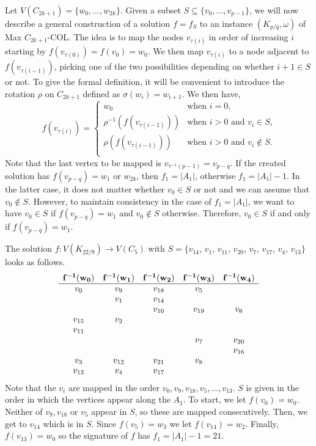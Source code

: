 \documentclass[11pt,a4paper]{article}
\begin{document}
Let $V(C_{2k+1}) = \{w_0, \ldots, w_{2k}\}$.
Given a subset $S \subseteq \{v_0, \ldots, v_{p-1}\}$, we will now describe a general construction
of a solution $f = f_S$ to an instance $(K_{p/q}, \omega)$ of {\sc Max $C_{2k+1}$-COL}.
The idea is to map the nodes $v_{\tau(i)}$ in order of increasing $i$ starting by $f(v_{\tau(0)}) = f(v_0) = w_0$. We then map $v_{\tau(i)}$ to a node adjacent to $f(v_{\tau(i-1)})$, picking one of the two possibilities depending on whether $i+1 \in S$ or not.
To give the formal definition, it will be convenient to introduce the rotation
$\rho$ on $C_{2k+1}$ defined as $\sigma(w_i) = w_{i+1}$.
We then have,
\[
f(v_{\tau(i)}) = \begin{cases}
  w_0 & \text{when $i = 0$,} \\
  \rho^{-1}(f(v_{\tau(i-1)})) & \text{when $i > 0$ and $v_i \in S$,} \\
  \rho(f(v_{\tau(i-1)})) & \text{when $i > 0$ and $v_i \not\in S$.} \\
\end{cases}
\]
Note that the last vertex to be mapped is $v_{\tau^{-1}(p-1)} = v_{p-q}$.
If the created solution has $f(v_{p-q}) = w_1$ or $w_{2k}$, then
$f_1 = |A_1|$, otherwise $f_1 = |A_1| - 1$.
In the latter case, it does not matter whether $v_0 \in S$ or not and we
can assume that $v_0 \not\in S$.
However, to maintain consistency in the case of $f_1 =|A_1|$,
we want to have $v_0 \in S$ if $f(v_{p-q}) = w_1$ and
$v_0 \not\in S$ otherwise.
Therefore, $v_0 \in S$ if and only if $f(v_{p-q}) = w_1$.


\begin{exmp}
The solution $f : V(K_{22/9}) \rightarrow V(C_5)$ with $S = \{v_{14}$, $v_1$, $v_{11}$, $v_{20}$, $v_7$, $v_{17}$, $v_4$, $v_{13}\}$ looks as follows.
\[
\begin{array}{c c c c c}
{\bf f^{-1}(w_0)} & {\bf f^{-1}(w_1)} & {\bf f^{-1}(w_2)} & {\bf f^{-1}(w_3)} & {\bf f^{-1}(w_4)} \\ \hline
v_0 & v_9 & v_{18} & v_5 & \\
& v_{1} & v_{14} &  \\
& & v_{10} & v_{19} & v_6 \\
v_{15} & v_{2} & & & \\
v_{11} & & & & \\
& & & v_7 & v_{20} \\
& & & & v_{16} \\
v_3 & v_{12} & v_{21} & v_8 & \\
v_{13} & v_4 & v_{17} & &
\end{array}
\]
Note that the $v_i$ are mapped in the order $v_0, v_9, v_{18}, v_5, \ldots, v_{13}$.
$S$ is given in the order in which the vertices appear along the $A_1$.
To start, we let $f(v_0) = w_0$. Neither of $v_9, v_{18}$ or $v_5$ appear in
$S$, so these are mapped consecutively.
Then, we get to $v_{14}$ which is in $S$.
Since $f(v_5) = w_3$ we let $f(v_{14}) = w_2$. 
Finally, $f(v_{13})=w_0$ so the signature of $f$ has $f_1 = |A_1|-1 = 21$.   
\end{exmp}
\end{document}
